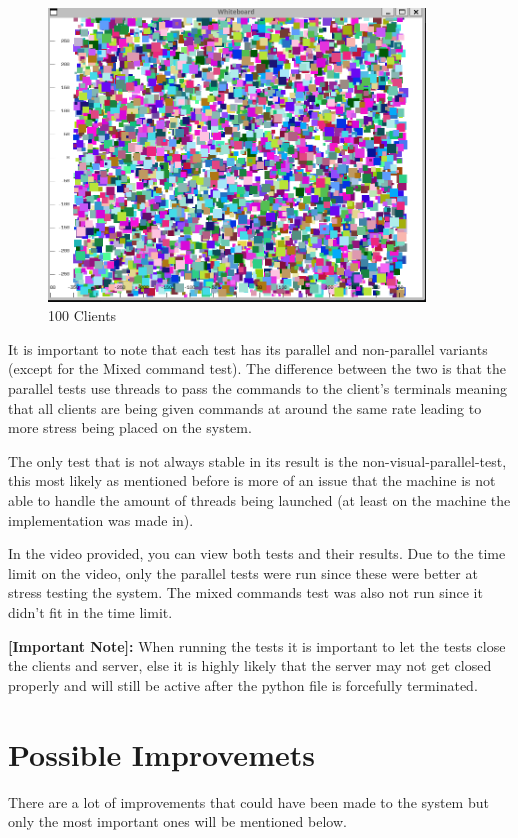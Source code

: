 \documentclass[12pt, a4paper]{report}
\begin{document}
\begin{figure}[!htp]
    \centering
    \includegraphics[width=10cm]{100 clients.PNG}
    \caption{100 Clients}
    \label{StressTest}
\end{figure}


It is important to note that each test has its parallel and non-parallel variants (except for the Mixed command test). The difference between the two is that the parallel tests use threads to pass the commands to the client's terminals meaning that all clients are being given commands at around the same rate leading to more stress being placed on the system.

The only test that is not always stable in its result is the non-visual-parallel-test, this most likely as mentioned before is more of an issue that the machine is not able to handle the amount of threads being launched (at least on the machine the implementation was made in).

In the video provided, you can view both tests and their results. Due to the time limit on the video, only the parallel tests were run since these were better at stress testing the system. The mixed commands test was also not run since it didn't fit in the time limit.


\textbf{[Important Note]:} When running the tests it is important to let the tests close the clients and server, else it is highly likely that the server may not get closed properly and will still be active after the python file is forcefully terminated.

\chapter{Possible Improvemets}
There are a lot of improvements that could have been made to the system but only the most important ones will be mentioned below.
\end{document}

